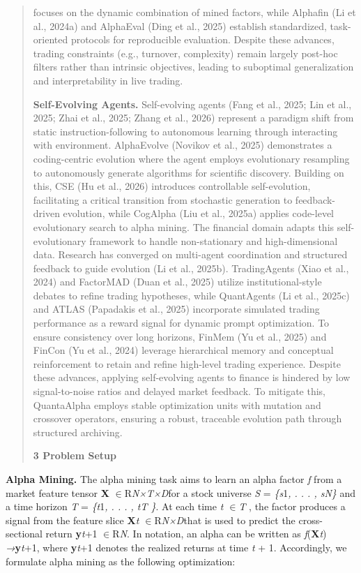 \documentclass[
]{article}
\begin{document}
\begin{quote}
focuses on the dynamic combination of mined factors, while Alphafin (Li
et al., 2024a) and AlphaEval (Ding et al., 2025) establish standardized,
task-oriented protocols for reproducible evaluation. Despite these
advances, trading constraints (e.g., turnover, complexity) remain
largely post-hoc filters rather than intrinsic objectives, leading to
suboptimal generalization and interpretability in live trading.

\textbf{Self-Evolving Agents.} Self-evolving agents (Fang et al., 2025;
Lin et al., 2025; Zhai et al., 2025; Zhang et al., 2026) represent a
paradigm shift from static instruction-following to autonomous learning
through interacting with environment. AlphaEvolve (Novikov et al., 2025)
demonstrates a coding-centric evolution where the agent employs
evolutionary resampling to autonomously generate algorithms for
scientific discovery. Building on this, CSE (Hu et al., 2026) introduces
controllable self-evolution, facilitating a critical transition from
stochastic generation to feedback-driven evolution, while CogAlpha (Liu
et al., 2025a) applies code-level evolutionary search to alpha mining.
The financial domain adapts this self-evolutionary framework to handle
non-stationary and high-dimensional data. Research has converged on
multi-agent coordination and structured feedback to guide evolution (Li
et al., 2025b). TradingAgents (Xiao et al., 2024) and FactorMAD (Duan et
al., 2025) utilize institutional-style debates to refine trading
hypotheses, while QuantAgents (Li et al., 2025c) and ATLAS (Papadakis et
al., 2025) incorporate simulated trading performance as a reward signal
for dynamic prompt optimization. To ensure consistency over long
horizons, FinMem (Yu et al., 2025) and FinCon (Yu et al., 2024) leverage
hierarchical memory and conceptual reinforcement to retain and refine
high-level trading experience. Despite these advances, applying
self-evolving agents to finance is hindered by low signal-to-noise
ratios and delayed market feedback. To mitigate this, QuantaAlpha
employs stable optimization units with mutation and crossover operators,
ensuring a robust, traceable evolution path through structured
archiving.

\textbf{3 Problem Setup}
\end{quote}

\textbf{Alpha Mining.} The alpha mining task aims to learn an alpha
factor \emph{f} from a market feature tensor \textbf{X}
\emph{$\in$}R\emph{N×T×D}for a stock universe \emph{S} = \emph{\{s}1\emph{,
. . . , sN\}} and a time horizon \emph{T} = \emph{\{t}1\emph{, . . . ,
tT \}}. At each time \emph{t $\in$T} , the factor produces a signal from the
feature slice \textbf{X}\emph{t $\in$}R\emph{N×D}that is used to predict the
cross-sectional return \textbf{y}\emph{t}+1 \emph{$\in$}R\emph{N}. In
notation, an alpha can be written as \emph{f}(\textbf{X}\emph{t})
\emph{→}\textbf{y}\emph{t}+1, where \textbf{y}\emph{t}+1 denotes the
realized returns at time \emph{t} + 1. Accordingly, we formulate alpha
mining as the following optimization:
\end{document}
